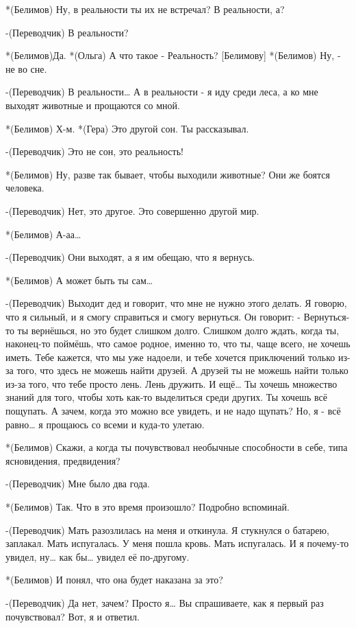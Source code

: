 *(Белимов) Ну, в реальности ты их не встречал? В реальности, а?

-(Переводчик) В реальности?

*(Белимов)Да.
*(Ольга) А что такое - Реальность? [Белимову]
*(Белимов) Ну, - не во сне.

-(Переводчик) В реальности… А в реальности - я иду среди леса, а ко мне выходят животные и прощаются со мной.

*(Белимов) Х-м.
*(Гера) Это другой сон. Ты рассказывал.

-(Переводчик) Это не сон, это реальность!

*(Белимов) Ну, разве так бывает, чтобы выходили животные? Они же боятся человека.

-(Переводчик) Нет, это другое. Это совершенно другой мир.

*(Белимов) А-аа…

-(Переводчик) Они выходят, а я им обещаю, что я вернусь. 

*(Белимов) А может быть ты сам…

-(Переводчик) Выходит дед и говорит, что мне не нужно этого делать. Я говорю, что я сильный, и я смогу справиться и смогу вернуться. Он говорит: -  Вернуться-то ты вернёшься, но это будет слишком долго. Слишком долго ждать, когда ты, наконец-то поймёшь, что самое родное, именно то, что ты, чаще всего, не хочешь иметь. Тебе кажется, что мы уже надоели, и тебе хочется приключений только из-за того, что здесь не можешь найти друзей. А друзей ты не можешь найти только из-за того, что тебе просто лень. Лень дружить. И ещё… Ты хочешь множество знаний для того, чтобы хоть как-то выделиться среди других. Ты хочешь всё пощупать. А зачем, когда это можно все увидеть, и не надо щупать? Но, я - всё равно… я прощаюсь со всеми и куда-то улетаю.

*(Белимов) Скажи, а когда ты почувствовал необычные способности в себе, типа ясновидения, предвидения?


-(Переводчик) Мне было два года.

*(Белимов) Так. Что в это время произошло? Подробно вспоминай.

-(Переводчик) Мать разозлилась на меня и откинула. Я стукнулся о  батарею, заплакал. Мать испугалась. У меня пошла кровь. Мать испугалась. И я почему-то увидел, ну… как бы… увидел её по-другому.

*(Белимов) И понял, что она будет наказана за это?

-(Переводчик) Да нет, зачем? Просто я… Вы спрашиваете, как я первый раз почувствовал? Вот, я и ответил.

